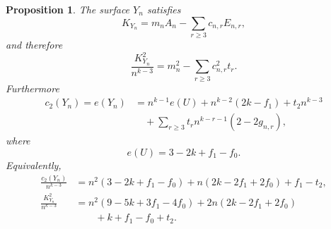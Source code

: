 \documentclass[11pt]{article}
\newtheorem{proposition}[theorem]{Proposition}
\begin{document}
\begin{proposition}\label{prop:chern}
The surface $Y_n$ satisfies
\begin{equation}\label{eq:K-general}
        K_{Y_n}=m_nA_n-\sum_{r\ge3}c_{n,r}E_{n,r},
\end{equation}
and therefore
\begin{equation}\label{eq:K2-direct}
 \frac{K_{Y_n}^2}{n^{k-3}}
 =m_n^2-\sum_{r\ge3}c_{n,r}^2t_r.
\end{equation}
Furthermore
\begin{equation}\label{eq:c2-strata}
\begin{aligned}
 c_2(Y_n)=e(Y_n)
 &=n^{k-1}e(U)+n^{k-2}(2k-f_1)+t_2n^{k-3}\\
 &\quad+\sum_{r\ge3}t_r n^{k-r-1}(2-2g_{n,r}),
\end{aligned}
\end{equation}
where
\begin{equation}\label{eq:eU}
        e(U)=3-2k+f_1-f_0.
\end{equation}
Equivalently,
\begin{align}
 \frac{c_2(Y_n)}{n^{k-3}}
 &=n^2(3-2k+f_1-f_0)
   +n(2k-2f_1+2f_0)+f_1-t_2,\label{eq:c2-closed}\\
 \frac{K_{Y_n}^2}{n^{k-3}}
 &=n^2(9-5k+3f_1-4f_0)
   +2n(2k-2f_1+2f_0)\\
 &\qquad +k+f_1-f_0+t_2.\label{eq:K2-closed}
\end{align}
\end{proposition}
\end{document}
